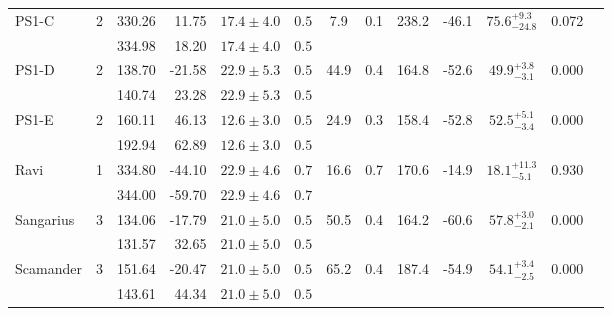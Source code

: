 \begin{tabular}{lcrrccccccccr}
	\multirow{2}{*}{PS1-C} & \multirow{2}{*}{2} & 330.26 & 11.75 & $17.4 \pm 4.0$ & $0.5$ & \multirow{2}{*}{7.9} & \multirow{2}{*}{0.1} & \multirow{2}{*}{238.2} & \multirow{2}{*}{-46.1} & \multirow{2}{*}{$75.6^{+9.3}_{-24.8}$} & \multirow{2}{*}{0.072} & \multirow{2}{*}{\citet{Bernard:2016}} \\
	 &  & 334.98 & 18.20 & $17.4 \pm 4.0$ & $0.5$ &  &  &  &  &  &  &  \\
	\multirow{2}{*}{PS1-D} & \multirow{2}{*}{2} & 138.70 & -21.58 & $22.9 \pm 5.3$ & $0.5$ & \multirow{2}{*}{44.9} & \multirow{2}{*}{0.4} & \multirow{2}{*}{164.8} & \multirow{2}{*}{-52.6} & \multirow{2}{*}{$49.9^{+3.8}_{-3.1}$} & \multirow{2}{*}{0.000} & \multirow{2}{*}{\citet{Bernard:2016}} \\
	 &  & 140.74 & 23.28 & $22.9 \pm 5.3$ & $0.5$ &  &  &  &  &  &  &  \\
	\multirow{2}{*}{PS1-E} & \multirow{2}{*}{2} & 160.11 & 46.13 & $12.6 \pm 3.0$ & $0.5$ & \multirow{2}{*}{24.9} & \multirow{2}{*}{0.3} & \multirow{2}{*}{158.4} & \multirow{2}{*}{-52.8} & \multirow{2}{*}{$52.5^{+5.1}_{-3.4}$} & \multirow{2}{*}{0.000} & \multirow{2}{*}{\citet{Bernard:2016}} \\
	 &  & 192.94 & 62.89 & $12.6 \pm 3.0$ & $0.5$ &  &  &  &  &  &  &  \\
	\multirow{2}{*}{Ravi} & \multirow{2}{*}{1} & 334.80 & -44.10 & $22.9 \pm 4.6$ & $0.7$ & \multirow{2}{*}{16.6} & \multirow{2}{*}{0.7} & \multirow{2}{*}{170.6} & \multirow{2}{*}{-14.9} & \multirow{2}{*}{$18.1^{+11.3}_{-5.1}$} & \multirow{2}{*}{0.930} & \multirow{2}{*}{\citet{Shipp:2018}} \\
	 &  & 344.00 & -59.70 & $22.9 \pm 4.6$ & $0.7$ &  &  &  &  &  &  &  \\
	\multirow{2}{*}{Sangarius} & \multirow{2}{*}{3} & 134.06 & -17.79 & $21.0 \pm 5.0$ & $0.5$ & \multirow{2}{*}{50.5} & \multirow{2}{*}{0.4} & \multirow{2}{*}{164.2} & \multirow{2}{*}{-60.6} & \multirow{2}{*}{$57.8^{+3.0}_{-2.1}$} & \multirow{2}{*}{0.000} & \multirow{2}{*}{\citet{Grillmair:2017a}} \\
	 &  & 131.57 & 32.65 & $21.0 \pm 5.0$ & $0.5$ &  &  &  &  &  &  &  \\
	\multirow{2}{*}{Scamander} & \multirow{2}{*}{3} & 151.64 & -20.47 & $21.0 \pm 5.0$ & $0.5$ & \multirow{2}{*}{65.2} & \multirow{2}{*}{0.4} & \multirow{2}{*}{187.4} & \multirow{2}{*}{-54.9} & \multirow{2}{*}{$54.1^{+3.4}_{-2.5}$} & \multirow{2}{*}{0.000} & \multirow{2}{*}{\citet{Grillmair:2017a}} \\
	 &  & 143.61 & 44.34 & $21.0 \pm 5.0$ & $0.5$ &  &  &  &  &  &  &  \\

\end{tabular}
